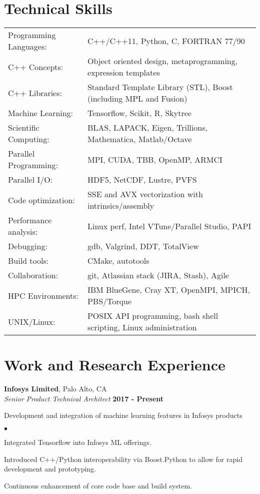 \documentclass[overlap,line]{cv}
\newenvironment{list2}{
  \begin{list}{$\bullet$}{%
      \setlength{\itemsep}{0in}
      \setlength{\parsep}{0in} \setlength{\parskip}{0in}
      \setlength{\topsep}{0in} \setlength{\partopsep}{0in} 
      \setlength{\leftmargin}{0.2in}}}{\end{list}}
\begin{document}
\begin{resume}
\section{\sc Technical Skills}
\vspace{.05in}
\begin{tabular}{ l @{\hskip 1em} l }
Programming Languages: & C++/C++11, Python, C, FORTRAN 77/90 \\
C++ Concepts: & Object oriented design, metaprogramming, expression templates \\
C++ Libraries: & Standard Template Library (STL), Boost (including MPL and Fusion)\\
Machine Learning: & Tensorflow, Scikit, R, Skytree \\
Scientific Computing: & BLAS, LAPACK, Eigen, Trillions, Mathematica, Matlab/Octave \\
Parallel Programming: & MPI, CUDA, TBB, OpenMP, ARMCI \\
Parallel I/O: & HDF5, NetCDF, Lustre, PVFS \\
Code optimization: & SSE and AVX vectorization with intrinsics/assembly \\
Performance analysis: & Linux perf, Intel VTune/Parallel Studio, PAPI \\
Debugging: & gdb, Valgrind, DDT, TotalView \\
Build tools: & CMake, autotools \\
Collaboration: & git, Atlassian stack (JIRA, Stash), Agile \\
HPC Environments: & IBM BlueGene, Cray XT, OpenMPI, MPICH, PBS/Torque \\
UNIX/Linux: & POSIX API programming, bash shell scripting, Linux administration \\
\end{tabular}


\section{\sc Work and Research Experience}
\vspace{.05in}
{\bf Infosys Limited}, Palo Alto, CA \\
{\it Senior Product Technical Architect} \hfill {\bf 2017 - Present}

Development and integration of machine learning features in Infosys products
\vspace{.05in}
\begin{list2}
\item Integrated Tensorflow into Infosys ML offerings.
\item Introduced C++/Python interoperability via Boost.Python to allow for rapid development and prototyping.
\item Continuous enhancement of core code base and build system.
\end{list2}


\end{resume}
\end{document}
